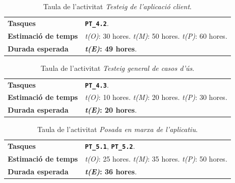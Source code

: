 \documentclass[a4paper,12pt]{ThesisStyle}
\begin{document}
\begin{table}[H]
  \begin{tabularx}{\textwidth}{l | X}
    \toprule
    \rowcolor{Orange}
    \multicolumn{2}{c}{\texttt{\textbf{A18:}} Testeig de l'aplicació client}\\
    \midrule[0.9pt]
    \textbf{Tasques}                 & \texttt{\textbf{PT\_4.2}}.\\
    \midrule
    \textbf{Estimació de temps}      & \textit{t(O)}: 30 hores.
    \newline \textit{t(M)}: 50 hores.
    \newline \textit{t(P)}: 60 hores.\\
    \midrule
    \textbf{Durada esperada}         & \textbf{\textit{t(E)}: 49 hores}.\\
    \bottomrule
  \end{tabularx}
  \caption{\label{taula:a18} Taula de l'activitat \emph{Testeig de l'aplicació client}.}
\end{table}

\begin{table}[H]
  \begin{tabularx}{\textwidth}{l | X}
    \toprule
    \rowcolor{Orange}
    \multicolumn{2}{c}{\texttt{\textbf{A19:}} Testeig general de casos d'ús}\\
    \midrule[0.9pt]
    \textbf{Tasques}                 & \texttt{\textbf{PT\_4.3}}.\\
    \midrule
    \textbf{Estimació de temps}      & \textit{t(O)}: 10 hores.
    \newline \textit{t(M)}: 20 hores.
    \newline \textit{t(P)}: 30 hores.\\
    \midrule
    \textbf{Durada esperada}         & \textbf{\textit{t(E)}: 20 hores}.\\
    \bottomrule
  \end{tabularx}
  \caption{\label{taula:a19} Taula de l'activitat \emph{Testeig general de casos d'ús}.}
\end{table}

\begin{table}[H]
  \begin{tabularx}{\textwidth}{l | X}
    \toprule
    \rowcolor{Purple}
    \multicolumn{2}{c}{\texttt{\textbf{A20:}} Posada en marxa de l'aplicatiu}\\
    \midrule[0.9pt]
    \textbf{Tasques}                 & \texttt{\textbf{PT\_5.1}}, \texttt{\textbf{PT\_5.2}}.\\
    \midrule
    \textbf{Estimació de temps}      & \textit{t(O)}: 25 hores.
    \newline \textit{t(M)}: 35 hores.
    \newline \textit{t(P)}: 50 hores.\\
    \midrule
    \textbf{Durada esperada}         & \textbf{\textit{t(E)}: 36 hores}.\\
    \bottomrule
  \end{tabularx}
  \caption{\label{taula:a20} Taula de l'activitat \emph{Posada en marxa de l'aplicatiu}.}
\end{table}
\end{document}
